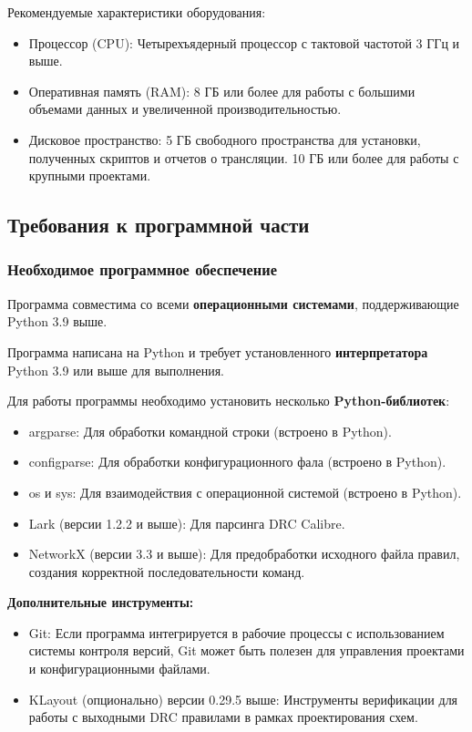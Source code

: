 Рекомендуемые характеристики оборудования:

\begin{itemize}
	\item Процессор (CPU):
		Четырехъядерный процессор с тактовой частотой 3 ГГц и выше.
	\item Оперативная память (RAM):
		8 ГБ или более для работы с большими объемами данных
		и увеличенной производительностью.
	\item Дисковое пространство:
		5 ГБ свободного пространства для установки, полученных скриптов
		и отчетов о трансляции.
		10 ГБ или более для работы с крупными проектами.
\end{itemize}

\subsection{Требования к программной части}

\subsubsection{Необходимое программное обеспечение}

Программа совместима со всеми \textbf{операционными системами},
поддерживающие Python 3.9 выше.

Программа написана на Python
и требует установленного \textbf{интерпретатора} Python 3.9
или выше для выполнения.

Для работы программы необходимо установить
несколько \textbf{Python-библиотек}:
\begin{itemize}
	\item argparse:
		Для обработки командной строки (встроено в Python).
	\item configparse:
		Для обработки конфигурационного фала (встроено в Python).
	\item os и sys:
		Для взаимодействия с операционной системой (встроено в Python).
	\item Lark (версии 1.2.2 и выше):
		Для парсинга DRC Calibre.
	\item NetworkX (версии 3.3 и выше):
		Для предобработки исходного файла правил,
		создания корректной последовательности команд.
\end{itemize}

\textbf{Дополнительные инструменты:}

\begin{itemize}
	\item Git: Если программа интегрируется в рабочие процессы
		с использованием системы контроля версий,
		Git может быть полезен для управления проектами
		и конфигурационными файлами.
	\item KLayout (опционально) версии 0.29.5 выше:
		Инструменты верификации для работы
		с выходными DRC правилами в рамках проектирования схем.
\end{itemize}

